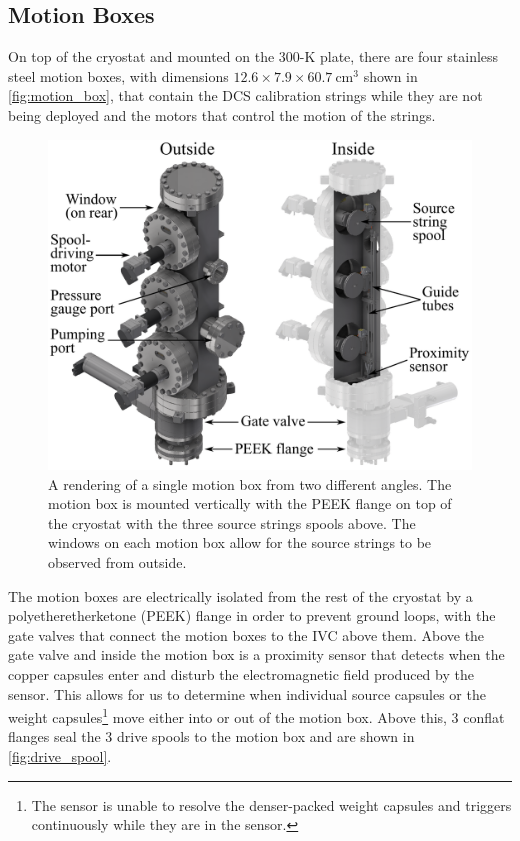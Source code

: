 \subsection*{Motion Boxes}
On top of the cryostat and mounted on the 300-K plate, there are four stainless steel motion boxes, with dimensions $12.6\times7.9\times60.7~\textrm{cm}^3$ shown in \autoref{fig:motion_box}, that contain the DCS calibration strings while they are not being deployed and the motors that control the motion of the strings.
\begin{figure}[htpb]
\includegraphics[width=0.9\linewidth]{Figures/motion_box.pdf}
\caption[A rendering of a single motion box from two different angles]
{A rendering of a single motion box from two different angles. The motion box is mounted vertically with the PEEK flange on top of the cryostat with the three source strings spools above. The windows on each motion box allow for the source strings to be observed from outside.}
\label{fig:motion_box}
\end{figure}
The motion boxes are electrically isolated from the rest of the cryostat by a polyetheretherketone (PEEK) flange in order to prevent ground loops, with the gate valves that connect the motion boxes to the IVC above them.
Above the gate valve and inside the motion box is a proximity sensor that detects when the copper capsules enter and disturb the electromagnetic field produced by the sensor.
This allows for us to determine when individual source capsules or the weight capsules\footnote{The sensor is unable to resolve the denser-packed weight capsules and triggers continuously while they are in the sensor.} move either into or out of the motion box.
Above this, 3 conflat flanges seal the 3 drive spools to the motion box and are shown in \autoref{fig:drive_spool}.
